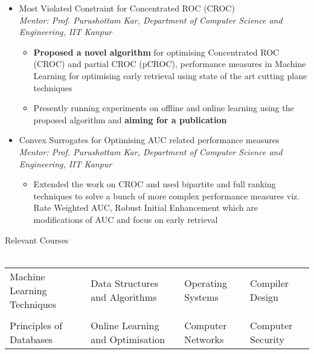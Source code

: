 \documentclass{article}
\begin{document}
\begin{itemize}[leftmargin=0.07cm]
\item[] {\large Most Violated Constraint for Concentrated ROC (CROC)}\hspace*{\fill}\\
\emph{Mentor: Prof. Purushottam Kar, Department of Computer Science and Engineering, IIT Kanpur
}	\begin{itemize}
	\item \textbf{Proposed a novel algorithm} for optimising Concentrated ROC (CROC) and partial CROC (pCROC), performance measures in Machine Learning for optimising early retrieval using state of the art cutting plane techniques
	\item Presently running experiments on offline and online learning using the proposed algorithm and \textbf{aiming for a publication}
	\end{itemize}
\end{itemize}\begin{itemize}[leftmargin=0.07cm]
\item[] {\large Convex Surrogates for Optimising AUC related performance measures}\hspace*{\fill}\\
\emph{Mentor: Prof. Purushottam Kar, Department of Computer Science and Engineering, IIT Kanpur
}	\begin{itemize}
	\item Extended the work on CROC and used bipartite and full ranking techniques to solve a bunch of more complex performance measures viz. Rate Weighted AUC, Robust Initial Enhancement which are modifications of AUC and focus on early retrieval
	\end{itemize}
\end{itemize}
{\Large Relevant Courses}\\\\
\begin{tabular}{p{4.5cm} p{5.3cm} p{3.5cm} p{4cm}}
Machine Learning Techniques & Data Structures and Algorithms & Operating Systems & Compiler Design\\\\\vspace{-0.4cm}Principles of Databases &\vspace{-0.4cm}Online Learning and Optimisation  &\vspace{-0.4cm}Computer Networks & \vspace{-0.4cm}Computer Security
\end{tabular}\vspace{0.1cm}\\
\end{document}
